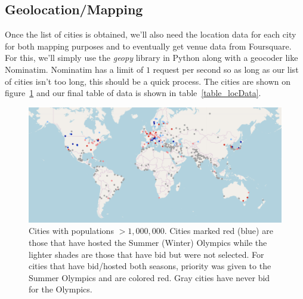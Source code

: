 \documentclass[
 reprint,
 amsmath,amssymb,
 aps,
prb,
floatfix
]{revtex4-2}
\begin{document}
    \subsection{Geolocation/Mapping}
    Once the list of cities is obtained, we'll also need the location data for each city for both mapping purposes and to eventually get venue data from Foursquare. For this, we'll simply use the \emph{geopy} library in Python along with a geocoder like Nominatim. Nominatim has a limit of $1$ request per second so as long as our list of cities isn't too long, this should be a quick process. The cities are shown on figure~\ref{map} and our final table of data is shown in table~\ref{table_locData}.

    \begin{figure}[htb]
        \centering
        \includegraphics[width=\textwidth]{../figures/world_map.png}
        \caption{Cities with populations $>1,000,000$. Cities marked red (blue) are those that have hosted the Summer (Winter) Olympics while the lighter shades are those that have bid but were not selected. For cities that have bid/hosted both seasons, priority was given to the Summer Olympics and are colored red. Gray cities have never bid for the Olympics.}
        \label{map}
    \end{figure}

\end{document}
